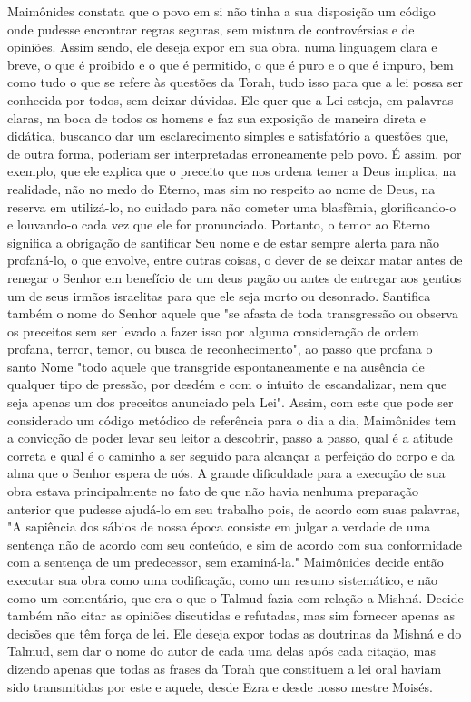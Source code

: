 Maimônides constata que o povo em si não tinha a sua disposição um
código onde pudesse encontrar regras seguras, sem mistura de
controvér­sias e de opiniões. Assim sendo, ele deseja expor em sua obra,
numa linguagem clara e breve, o que é proibido e o que é permitido, o
que é puro e o que é impuro, bem como tudo o que se refere às questões
da Torah, tudo isso para que a lei possa ser conhecida por todos, sem
deixar dúvidas. Ele quer que a Lei esteja, em palavras claras, na boca
de todos os homens e faz sua exposição de maneira direta e didática,
buscando dar um esclarecimento simples e satisfa­tório a questões que,
de outra forma, poderiam ser interpretadas erroneamente pelo povo. É
assim, por exemplo, que ele explica que o preceito que nos orde­na temer
a Deus implica, na realidade, não no medo do Eterno, mas sim no respeito
ao nome de Deus, na reserva em utilizá-lo, no cuidado para não come­ter
uma blasfêmia, glorificando-o e louvando-o cada vez que ele for
pronuncia­do. Portanto, o temor ao Eterno significa a obrigação de
santificar Seu nome e de estar sempre alerta para não profaná-lo, o que
envolve, entre outras coi­sas, o dever de se deixar matar antes de
renegar o Senhor em benefício de um deus pagão ou antes de entregar aos
gentios um de seus irmãos israelitas para que ele seja morto ou
desonrado. Santifica também o nome do Senhor aquele que "se afasta de
toda transgressão ou observa os preceitos sem ser levado a fazer isso
por alguma consideração de ordem profana, terror, temor, ou busca de
reconhecimento", ao passo que profana o santo Nome "todo aquele que
transgride espontaneamente e na ausência de qualquer tipo de pressão,
por des­dém e com o intuito de escandalizar, nem que seja apenas um dos
preceitos anunciado pela Lei". Assim, com este que pode ser considerado
um código me­tódico de referência para o dia a dia, Maimônides tem a
convicção de poder levar seu leitor a descobrir, passo a passo, qual é a
atitude correta e qual é o caminho a ser seguido para alcançar a
perfeição do corpo e da alma que o Se­nhor espera de nós.
A grande dificuldade para a execução de sua obra estava principal­mente
no fato de que não havia nenhuma preparação anterior que pudesse
aju­dá-lo em seu trabalho pois, de acordo com suas palavras, "A
sapiência dos sá­bios de nossa época consiste em julgar a verdade de uma
sentença não de acor­do com seu conteúdo, e sim de acordo com sua
conformidade com a sentença de um predecessor, sem examiná-la."
Maimônides decide então executar sua obra como uma codificação, como um
resumo sistemático, e não como um co­mentário, que era o que o Talmud
fazia com relação a Mishná. Decide também não citar as opiniões
discutidas e refutadas, mas sim fornecer apenas as deci­sões que têm
força de lei. Ele deseja expor todas as doutrinas da Mishná e do Talmud,
sem dar o nome do autor de cada uma delas após cada citação, mas dizendo
apenas que todas as frases da Torah que constituem a lei oral haviam
sido transmitidas por este e aquele, desde Ezra e desde nosso mestre
Moisés.

